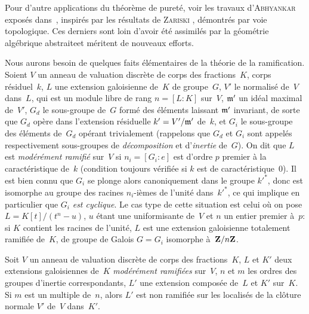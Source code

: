 \begin{remarque}
\label{X.3.5}
Pour d'autre applications du th\'eor\`eme de puret\'e, voir les
travaux
d'\textsc{Abhyankar}
expos\'es dans~\cite{X.4}, inspir\'es par les
r\'esultats de \textsc{Zariski} \cite[chap.\, VIII]{X.6}, d\'emontr\'es par voie
topologique. Ces derniers sont loin d'avoir \'et\'e assimil\'es
par la g\'eom\'etrie alg\'ebrique \og abstraite\fg et m\'eritent
de nouveaux efforts.
\end{remarque}

Nous
aurons besoin de quelques faits \'el\'ementaires de la th\'eorie
de la ramification. Soient $V$ un anneau de valuation discr\`ete de
corps des fractions~$K$, corps r\'esiduel~$k$, $L$ une extension
galoisienne de~$K$ de groupe~$G$, $V'$ le normalis\'e de~$V$
dans~$L$, qui est un module libre de rang $n=[L{\colon }K]$ sur~$V$,
$\mathfrak{m'}$ un id\'eal maximal de~$V'$, $G_d$ le sous-groupe de~$G$
form\'e des \'el\'ements laissant $\mathfrak{m'}$ invariant, de
sorte que $G_d$ op\`ere dans l'extension r\'esiduelle
$k'=V'/\mathfrak{m'}$ de~$k$, et $G_i$ le sous-groupe des \'el\'ements
de~$G_d$ op\'erant trivialement (rappelons que $G_d$ et $G_i$ sont
appel\'es respectivement sous-groupes de \emph{décomposition} et
d'\emph{inertie} de~$G$). On dit que $L$ est \emph{modérément
ramifié} sur~$V$ si $n_i=[G_i{\colon }e]$ est d'ordre $p$ premier
\`a la caract\'eristique de~$k$ (condition toujours
v\'erifi\'ee si $k$ est de caract\'eristique~0). Il est bien
connu que $G_i$ se plonge alors canoniquement dans le groupe ${k'}^*$,
donc est isomorphe au groupe des racines
$n_i$-i\`emes de l'unit\'e
dans~${k'}^*$, ce qui implique en particulier que $G_i$ \emph{est
cyclique}. Le cas type de cette situation est celui o\`u on pose
$L=K[t]/(t^n - u)$, $u$ \'etant une uniformisante de~$V$ et $n$ un
entier premier \`a~$p$: si $K$ contient les racines \niemes de
l'unit\'e, $L$ est une extension galoisienne totalement ramifi\'ee
de~$K$, de groupe de Galois $G=G_i$ isomorphe \`a~$\mathbf{Z}/n\mathbf{Z}$.

\begin{lemme}
\label{X.3.6}
Soit $V$ un anneau de valuation discr\`ete de
corps des fractions~$K$, $L$ et $K'$ deux extensions galoisiennes
de~$K$ \emph{modérément ramifiées} sur~$V$, $n$ et $m$ les
ordres des groupes d'inertie
correspondants,
$L'$ une extension
compos\'ee de~$L$ et $K'$ sur~$K$. Si $m$ est un multiple de~$n$,
alors $L'$ est non ramifi\'ee sur les localis\'es de la
cl\^oture normale $V'$ de~$V$ dans~$K'$.
\end{lemme}


